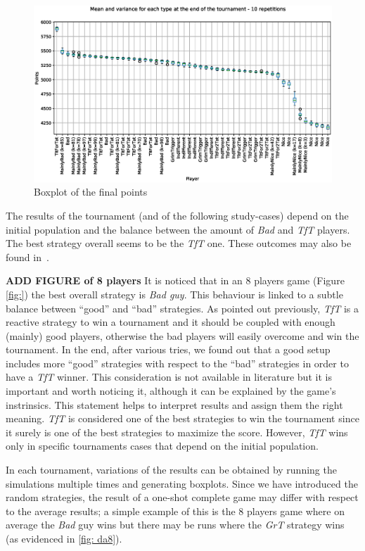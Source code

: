 \documentclass[journal,a4paper,10pt,twoside]{IEEEtran} %
\begin{document}
\begin{figure}[!ht]
    \centering
    \includegraphics[width=1\columnwidth]{../img/ipdmp/ipdmp-boxplot-final-points-50}
    \caption{Boxplot of the final points}
    \label{fig:boxIPDMPfinal}
\end{figure}

The results of the tournament (and of the following study-cases) depend on the initial population and the balance between the amount of \textit{Bad} and \textit{TfT} players. The best strategy overall seems to be the \textit{TfT} one.
These outcomes may also be found in~\cite{mathieu2017}.

\textbf{ADD FIGURE of 8 players}
It is noticed that in an 8 players game (Figure \ref{fig:}) the best overall strategy is \textit{Bad guy}. This behaviour is linked to a subtle balance between ``good'' and ``bad'' strategies. As pointed out previously, \textit{TfT} is a reactive strategy to win a tournament and it should be coupled with enough (mainly) good players, otherwise the bad players will easily overcome and win the tournament. In the end, after various tries, we found out that a good setup includes more ``good'' strategies with respect to the ``bad'' strategies in order to have a \textit{TfT} winner. This consideration is not available in literature but it is important and worth noticing it, although it can be explained by the game's instrinsics. This statement helps to interpret results and assign them the right meaning. \textit{TfT} is considered one of the best strategies to win the tournament since it surely is one of the best strategies to maximize the score. However, \textit{TfT} wins only in specific tournaments cases that depend on the initial population.

In each tournament, variations of the results can be obtained by running the simulations multiple times and generating boxplots.
Since we have introduced the random strategies, the result of a one-shot complete game may differ with respect to the average results; a simple example of this is the 8 players game where on average the \textit{Bad} guy wins but there may be runs where the \textit{GrT} strategy wins (as evidenced in \autoref{fig: da8}).
\end{document}
